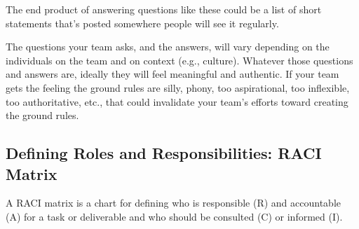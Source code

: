 The end product of answering questions like these could be a list of short statements that's posted somewhere people will see it regularly. 

The questions your team asks, and the answers, will vary depending on the individuals on the team and on context (e.g., culture). Whatever those questions and answers are, ideally they will feel meaningful and authentic. If your team gets the feeling the ground rules are silly, phony, too aspirational, too inflexible, too authoritative, etc., that could invalidate your team's efforts toward creating the ground rules.

\subsection{Defining Roles and Responsibilities: RACI Matrix}
\marginpar{\raciMatrixDef\margindivider}\marginpar{\mvpDef\margindivider}\marginpar{\focusGroupDef}A RACI matrix is a chart for defining who is responsible (R) and accountable (A) for a task or deliverable and who should be consulted (C) or informed (I). \\

